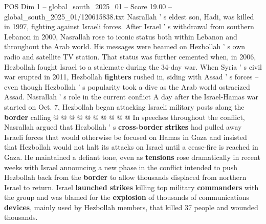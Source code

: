 \begin{textsample}{POS Dim 1 – global\_south\_2025\_01 – Score 19.00 – global\_south\_2025\_01/120615838.txt}
Nasrallah ' s eldest son, Hadi, was killed in 1997, fighting against Israeli forces.
After Israel ' s withdrawal from southern Lebanon in 2000, Nasrallah rose to iconic status both within Lebanon and throughout the Arab world.
His messages were beamed on Hezbollah ' s own radio and satellite TV station.
That status was further cemented when, in 2006, Hezbollah fought Israel to a stalemate during the 34-day war.
When Syria ' s civil war erupted in 2011, Hezbollah \textbf{fighters} rushed in, siding with Assad ' s forces -- even though Hezbollah ' s popularity took a dive as the Arab world ostracized Assad.
Nasrallah ' s role in the current conflict A day after the Israel-Hamas war started on Oct. 7, Hezbollah began attacking Israeli military posts along the \textbf{border} calling @ @ @ @ @ @ @ @ @ @ In speeches throughout the conflict, Nasrallah argued that Hezbollah ' s \textbf{cross-border} \textbf{strikes} had pulled away Israeli forces that would otherwise be focused on Hamas in Gaza and insisted that Hezbollah would not halt its attacks on Israel until a cease-fire is reached in Gaza.
He maintained a defiant tone, even as \textbf{tensions} rose dramatically in recent weeks with Israel announcing a new phase in the conflict intended to push Hezbollah back from the \textbf{border} to allow thousands displaced from northern Israel to return.
Israel \textbf{launched} \textbf{strikes} killing top military \textbf{commanders} with the group and was blamed for the \textbf{explosion} of thousands of communications \textbf{devices}, mainly used by Hezbollah members, that killed 37 people and wounded thousands.

\end{textsample}
